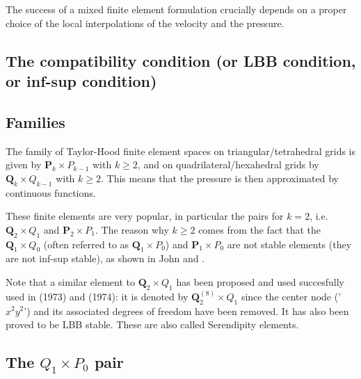 

The success of a mixed finite element formulation crucially depends on a proper choice of the local interpolations of the velocity and the pressure. 

\subsection{The compatibility condition (or LBB condition, or inf-sup condition)} \label{ss:LBBcond}
 



\subsection{Families}

The family of {\color{olive} Taylor-Hood} finite element spaces on triangular/tetrahedral 
grids is given by ${\bm P}_k \times P_{k-1}$ with $k\geq 2$, 
and on quadrilateral/hexahedral grids by ${\bm Q}_k \times Q_{k-1}$ with $k\geq 2$.
This means that the pressure is then approximated by continuous functions. 

These finite elements are very popular, in particular the pairs for $k=2$, i.e.
${\bm Q}_2\times Q_1$ and ${\bm P}_2\times P_1$.
The reason why $k\geq 2$ comes from the fact that the 
${\bm Q}_1 \times Q_0$ (often referred to as ${\bm Q}_1 \times P_0$) and ${\bm P}_1\times P_0$
are not stable elements (they are not inf-sup stable), as
shown in John \cite[p64]{john16} and \cite[p67]{john16}. 

\begin{remark}
Note that a similar element to ${\bm Q}_2 \times Q_1$ has been proposed
and used succesfully used in \textcite{taho73} (1973) and \textcite{hota74} (1974): 
it is denoted by ${\bm Q}_2^{(8)} \times Q_1$ 
since the center node ('$x^2y^2$') and its associated degrees of freedom have been removed. It 
has also been proved to be LBB stable. These are also called {\color{olive} Serendipity} elements. 
\end{remark}

\subsection{The $Q_1\times P_0$ pair} \label{ss:pairq1p0}



